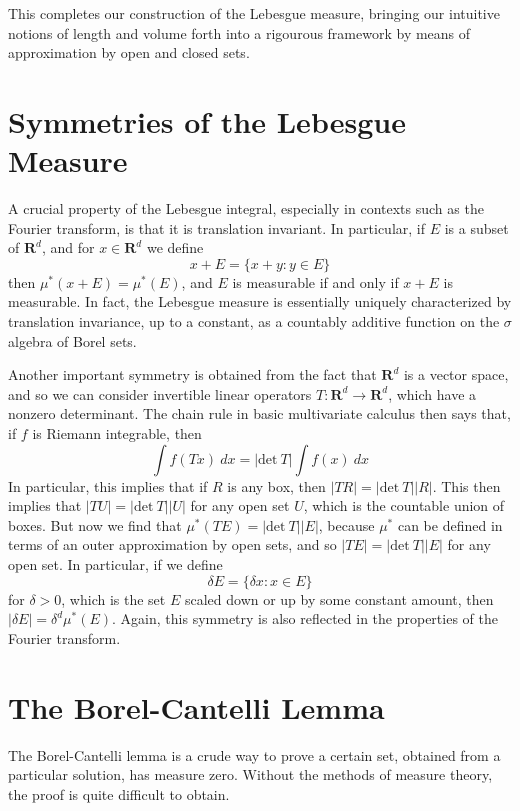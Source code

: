 This completes our construction of the Lebesgue measure, bringing our intuitive notions of length and volume forth into a rigourous framework by means of approximation by open and closed sets.

\section{Symmetries of the Lebesgue Measure}

A crucial property of the Lebesgue integral, especially in contexts such as the Fourier transform, is that it is translation invariant. In particular, if $E$ is a subset of $\mathbf{R}^d$, and for $x \in \mathbf{R}^d$ we define
%
\[ x + E = \{ x + y : y \in E \} \]
%
then $\mu^*(x + E) = \mu^*(E)$, and $E$ is measurable if and only if $x + E$ is measurable. In fact, the Lebesgue measure is essentially uniquely characterized by translation invariance, up to a constant, as a countably additive function on the $\sigma$ algebra of Borel sets.

Another important symmetry is obtained from the fact that $\mathbf{R}^d$ is a vector space, and so we can consider invertible linear operators $T: \mathbf{R}^d \to \mathbf{R}^d$, which have a nonzero determinant. The chain rule in basic multivariate calculus then says that, if $f$ is Riemann integrable, then
%
\[ \int f(Tx)\ dx = |\text{det}\ T|\int f(x)\ dx \]
%
In particular, this implies that if $R$ is any box, then $|TR| = |\text{det}\ T| |R|$. This then implies that $|TU| = |\text{det}\ T| |U|$ for any open set $U$, which is the countable union of boxes. But now we find that $\mu^*(TE) = |\text{det}\ T| |E|$, because $\mu^*$ can be defined in terms of an outer approximation by open sets, and so $|TE| = |\text{det}\ T| |E|$ for any open set. In particular, if we define
%
\[ \delta E = \{ \delta x: x \in E \} \]
%
for $\delta > 0$, which is the set $E$ scaled down or up by some constant amount, then $|\delta E| = \delta^d \mu^*(E)$. Again, this symmetry is also reflected in the properties of the Fourier transform.

\section{The Borel-Cantelli Lemma}

The Borel-Cantelli lemma is a crude way to prove a certain set, obtained from a particular solution, has measure zero. Without the methods of measure theory, the proof is quite difficult to obtain.

